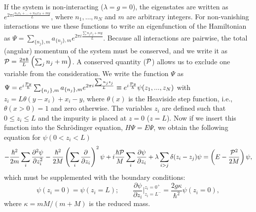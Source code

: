 \documentclass[reprint, twocolumn,amsmath,amssymb,showpacs,pra,superscriptaddress,aps]{revtex4-1}
\begin{document}
If the system is non-interacting ($\lambda=g=0$), the eigenstates are written as $e^{2\pi i \frac{n_1x_1+\ldots+n_N x_N+my}{L}}$, where $n_1,\ldots,n_N$ and $m$ are arbitrary integers. 
For non-vanishing interactions we use these functions to write an eigenfunction of the Hamiltonian as $\Psi=\sum_{\{n_j\},m} a_{\{n_j\},m}e^{2\pi i \frac{\sum n_jx_j+my}{L}}$. 
Because all interactions are pairwise, 
the total (angular) momentum of the system must be conserved, and we write it as ${\cal P}=\frac{2\pi\hbar}{L}\left(\sum_{j} n_j+m\right)$.
A conserved quantity (${\cal P}$) allows us to exclude one variable from the consideration. 
We write the function $\Psi$ as $\Psi=e^{i \frac{{\cal P} y}{\hbar}}\sum_{\{n_j\},m} a_{\{n_j\},m}e^{2\pi i \frac{\sum n_jz_j}{L}}\equiv e^{i \frac{{\cal P} y}{\hbar}} \psi(z_1,...,z_N)$ 
with $z_i=L\theta(y-x_i)+x_i-y$, where $\theta(x)$ is the Heaviside step function, i.e., 
$\theta(x>0) = 1$ and zero otherwise. The variables $z_i$ are defined such that $0\leq z_i \leq L$ and the impurity is placed at $z=0$ ($z=L$). Now if we insert this 
function into the Schr{\"o}dinger equation, $H\Psi=E\Psi$, we obtain the following equation for $\psi(0<z_i<L)$
\begin{equation}
-\frac{\hbar^2}{2m}\sum_i\frac{\partial^2 \psi}{\partial z_i^2}-\frac{\hbar^2}{2M}\left(\sum_{i}\frac{\partial }{\partial z_i}\right)^2\psi
+ i \frac{\hbar {\cal P}}{M}\sum_{i}\frac{\partial \psi}{\partial z_i}+\lambda \sum_{i>j}\delta(z_i-z_j)\psi=\left(E-\frac{{\cal P}^2}{2M}\right)\psi,
\end{equation}
which must be supplemented with the boundary conditions:
\begin{equation}
\psi(z_i=0)=\psi(z_i=L); \qquad \frac{\partial \psi}{\partial z_i}\bigg|^{z_i=0^+}_{z_i=L^-}= \frac{2 g \kappa}{\hbar^2} \psi(z_i=0),
\end{equation}
where $\kappa=mM/(m+M)$ is the reduced mass.
\end{document}
